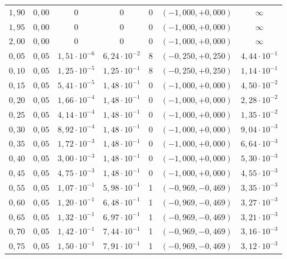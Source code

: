 \begin{tabular}{ccccccc}
$1{,}90$ & $0{,}00$ & $0$ & $0$ & 0 & $(-1{,}000, +0{,}000)$ & $\infty$ \\
$1{,}95$ & $0{,}00$ & $0$ & $0$ & 0 & $(-1{,}000, +0{,}000)$ & $\infty$ \\
$2{,}00$ & $0{,}00$ & $0$ & $0$ & 0 & $(-1{,}000, +0{,}000)$ & $\infty$ \\
$0{,}05$ & $0{,}05$ & $1{,}51 \cdot 10^{-6}$ & $6{,}24 \cdot 10^{-2}$ & 8 & $(-0{,}250, +0{,}250)$ & $4{,}44 \cdot 10^{-1}$ \\
$0{,}10$ & $0{,}05$ & $1{,}25 \cdot 10^{-5}$ & $1{,}25 \cdot 10^{-1}$ & 8 & $(-0{,}250, +0{,}250)$ & $1{,}14 \cdot 10^{-1}$ \\
$0{,}15$ & $0{,}05$ & $5{,}41 \cdot 10^{-5}$ & $1{,}48 \cdot 10^{-1}$ & 0 & $(-1{,}000, +0{,}000)$ & $4{,}50 \cdot 10^{-2}$ \\
$0{,}20$ & $0{,}05$ & $1{,}66 \cdot 10^{-4}$ & $1{,}48 \cdot 10^{-1}$ & 0 & $(-1{,}000, +0{,}000)$ & $2{,}28 \cdot 10^{-2}$ \\
$0{,}25$ & $0{,}05$ & $4{,}14 \cdot 10^{-4}$ & $1{,}48 \cdot 10^{-1}$ & 0 & $(-1{,}000, +0{,}000)$ & $1{,}35 \cdot 10^{-2}$ \\
$0{,}30$ & $0{,}05$ & $8{,}92 \cdot 10^{-4}$ & $1{,}48 \cdot 10^{-1}$ & 0 & $(-1{,}000, +0{,}000)$ & $9{,}04 \cdot 10^{-3}$ \\
$0{,}35$ & $0{,}05$ & $1{,}72 \cdot 10^{-3}$ & $1{,}48 \cdot 10^{-1}$ & 0 & $(-1{,}000, +0{,}000)$ & $6{,}64 \cdot 10^{-3}$ \\
$0{,}40$ & $0{,}05$ & $3{,}00 \cdot 10^{-3}$ & $1{,}48 \cdot 10^{-1}$ & 0 & $(-1{,}000, +0{,}000)$ & $5{,}30 \cdot 10^{-3}$ \\
$0{,}45$ & $0{,}05$ & $4{,}75 \cdot 10^{-3}$ & $1{,}48 \cdot 10^{-1}$ & 0 & $(-1{,}000, +0{,}000)$ & $4{,}55 \cdot 10^{-3}$ \\
$0{,}55$ & $0{,}05$ & $1{,}07 \cdot 10^{-1}$ & $5{,}98 \cdot 10^{-1}$ & 1 & $(-0{,}969, -0{,}469)$ & $3{,}35 \cdot 10^{-3}$ \\
$0{,}60$ & $0{,}05$ & $1{,}20 \cdot 10^{-1}$ & $6{,}48 \cdot 10^{-1}$ & 1 & $(-0{,}969, -0{,}469)$ & $3{,}27 \cdot 10^{-3}$ \\
$0{,}65$ & $0{,}05$ & $1{,}32 \cdot 10^{-1}$ & $6{,}97 \cdot 10^{-1}$ & 1 & $(-0{,}969, -0{,}469)$ & $3{,}21 \cdot 10^{-3}$ \\
$0{,}70$ & $0{,}05$ & $1{,}42 \cdot 10^{-1}$ & $7{,}44 \cdot 10^{-1}$ & 1 & $(-0{,}969, -0{,}469)$ & $3{,}16 \cdot 10^{-3}$ \\
$0{,}75$ & $0{,}05$ & $1{,}50 \cdot 10^{-1}$ & $7{,}91 \cdot 10^{-1}$ & 1 & $(-0{,}969, -0{,}469)$ & $3{,}12 \cdot 10^{-3}$ \\

\end{tabular}
